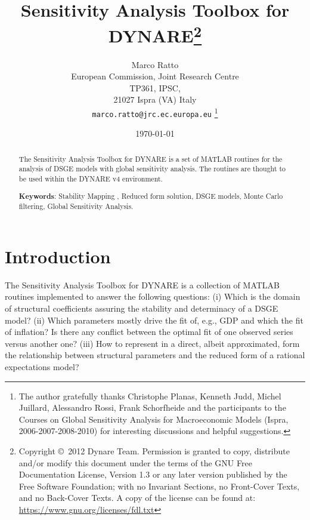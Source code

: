 \documentclass[12pt,a4paper]{article}
\begin{document}
\title{Sensitivity Analysis Toolbox for DYNARE\thanks{Copyright \copyright~2012 Dynare
    Team. Permission is granted to copy, distribute and/or modify
    this document under the terms of the GNU Free Documentation
    License, Version 1.3 or any later version published by the Free
    Software Foundation; with no Invariant Sections, no Front-Cover
    Texts, and no Back-Cover Texts. A copy of the license can be found
    at: \url{https://www.gnu.org/licenses/fdl.txt}}}

\author{Marco Ratto\\
European Commission, Joint Research Centre \\
TP361, IPSC, \\21027 Ispra
(VA) Italy\\
\texttt{marco.ratto@jrc.ec.europa.eu}
\thanks{The author gratefully thanks Christophe Planas, Kenneth Judd, Michel Juillard,
Alessandro Rossi, Frank Schorfheide and the participants to the
Courses on Global Sensitivity Analysis for Macroeconomic
Models (Ispra, 2006-2007-2008-2010) for interesting discussions and
helpful suggestions.}}

\date{\today}
\maketitle %


\begin{abstract}
\noindent The Sensitivity Analysis Toolbox for DYNARE is a set of
MATLAB routines for the analysis of DSGE models with global
sensitivity analysis. The routines are thought to be used within
the DYNARE v4 environment.


\begin{description}
  \item \textbf{Keywords}: Stability Mapping , Reduced form solution, DSGE models,
  Monte Carlo filtering,   Global Sensitivity Analysis.
\end{description}
\end{abstract}
\newpage
\section{Introduction} \label{s:intro}
The Sensitivity Analysis Toolbox for DYNARE is a collection of
MATLAB routines implemented to answer the following questions: (i)
Which is the domain of structural coefficients assuring the
stability and determinacy of a DSGE model? (ii) Which parameters
mostly drive the fit of, e.g., GDP and which the fit of inflation?
Is there any conflict between the optimal fit of one observed
series versus another one? (iii) How to represent in a direct,
albeit approximated, form the relationship between structural
parameters and the reduced form of a rational expectations model?
\end{document}
